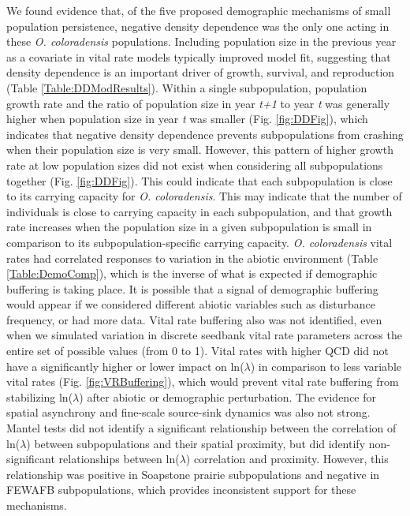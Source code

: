 \documentclass[12pt, letterpaper]{article}
\begin{document}
We found evidence that, of the five proposed demographic mechanisms of small population persistence, negative density dependence was the only one acting in these \textit{O. coloradensis} populations. Including population size in the previous year as a covariate in vital rate models typically improved model fit, suggesting that density dependence is an important driver of growth, survival, and reproduction (Table \ref{Table:DDModResults}). Within a single subpopulation, population growth rate and the ratio of population size in year \textit{t+1} to year \textit{t} was generally higher when population size in year \textit{t} was smaller (Fig. \ref{fig:DDFig}), which indicates that negative density dependence prevents subpopulations from crashing when their population size is very small.  However, this pattern of higher growth rate at low population sizes did not exist when considering all subpopulations together (Fig. \ref{fig:DDFig}). This could indicate that each subpopulation is close to its carrying capacity for \textit{O. coloradensis}. This may indicate that the number of individuals is close to carrying capacity in each subpopulation, and that growth rate increases when the population size in a given subpopulation is small in comparison to its subpopulation-specific carrying capacity. \textit{O. coloradensis} vital rates had correlated responses to variation in the abiotic environment (Table \ref{Table:DemoComp}), which is the inverse of what is expected if demographic buffering is taking place. It is possible that a signal of demographic buffering would appear if we considered different abiotic variables such as disturbance frequency, or had more data. Vital rate buffering also was not identified, even when we simulated variation in discrete seedbank vital rate parameters across the entire set of possible values (from 0 to 1). Vital rates with higher QCD  did not have a significantly higher or lower impact on ln($\lambda$) in comparison to less variable vital rates (Fig. \ref{fig:VRBuffering}), which would prevent vital rate buffering from stabilizing ln($\lambda$) after abiotic or demographic perturbation. The evidence for spatial asynchrony and fine-scale source-sink dynamics was also not strong. Mantel tests did not identify a significant relationship between the correlation of ln($\lambda$) between subpopulations and their spatial proximity, but did identify non-significant relationships between ln($\lambda$) correlation and proximity. However, this relationship was positive in Soapstone prairie subpopulations and negative in FEWAFB subpopulations, which provides inconsistent support for these mechanisms.  
\end{document}
